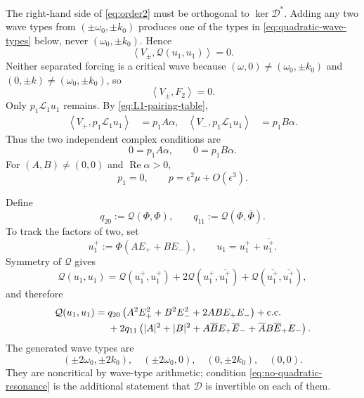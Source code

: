 \documentclass[11pt]{article}
\newcommand{\cQ}{\mathcal{Q}}
\newcommand{\cL}{\mathcal{L}}
\newcommand{\cD}{\mathcal{D}}
\newcommand{\ip}[2]{\left\langle #1,#2\right\rangle}
\newcommand{\cc}{\mathrm{c.c.}}
\DeclareMathOperator{\RePart}{Re}
\begin{document}
The right-hand side of \eqref{eq:order2} must be orthogonal to
$\ker\cD^*$.  Adding any two wave types from
$(\pm\omega_0,\pm k_0)$ produces one of the types in
\eqref{eq:quadratic-wave-types} below, never $(\omega_0,\pm k_0)$.  Hence
\begin{equation}
 \ip{V_\pm}{\cQ(u_1,u_1)}=0.
 \label{eq:Q-second-projection}
\end{equation}
Neither separated forcing is a critical wave because
$(\omega,0)\ne(\omega_0,\pm k_0)$ and
$(0,\pm k)\ne(\omega_0,\pm k_0)$, so
\begin{equation}
 \ip{V_\pm}{F_2}=0.
 \label{eq:F2-projection}
\end{equation}
Only $p_1\cL_1u_1$ remains.  By
\eqref{eq:L1-pairing-table},
\begin{align}
 \ip{V_+}{p_1\cL_1u_1}&=p_1A\alpha,
 &\ip{V_-}{p_1\cL_1u_1}&=p_1B\alpha.
 \label{eq:p1-projections}
\end{align}
Thus the two independent complex conditions are
\begin{equation}
 0=p_1A\alpha,
 \qquad 0=p_1B\alpha.
 \label{eq:p1-conditions}
\end{equation}
For $(A,B)\ne(0,0)$ and $\RePart\alpha>0$,
\begin{equation}
 \boxed{p_1=0,\qquad p=\epsilon^2\mu+O(\epsilon^3).}
 \label{eq:p1-zero}
\end{equation}

Define
\begin{equation}
 q_{20}:=\cQ(\Phi,\Phi),
 \qquad
 q_{11}:=\cQ(\Phi,\overline\Phi).
 \label{eq:q-vectors}
\end{equation}
To track the factors of two, set
\begin{equation}
 u_1^+:=\Phi(AE_++BE_-),
 \qquad u_1=u_1^++\overline{u_1^+}.
\end{equation}
Symmetry of $\cQ$ gives
\begin{equation}
 \cQ(u_1,u_1)=\cQ(u_1^+,u_1^+)
 +2\cQ(u_1^+,\overline{u_1^+})
 +\cQ(\overline{u_1^+},\overline{u_1^+}),
 \label{eq:Q-three-parts}
\end{equation}
and therefore
\begin{align}
 \cQ(u_1,u_1)={}&q_{20}
 \left(A^2E_+^2+B^2E_-^2+2AB E_+E_-\right)+\cc
 \notag\\
 &+2q_{11}\left(
 |A|^2+|B|^2+A\overline B E_+\overline E_-
 +\overline A B\overline E_+E_-
 \right).
 \label{eq:Q-u1-u1}
\end{align}
The generated wave types are
\begin{equation}
 (\pm2\omega_0,\pm2k_0),\quad
 (\pm2\omega_0,0),\quad
 (0,\pm2k_0),\quad(0,0).
 \label{eq:quadratic-wave-types}
\end{equation}
They are noncritical by wave-type arithmetic; condition
\eqref{eq:no-quadratic-resonance} is the additional statement that $\cD$ is
invertible on each of them.
\end{document}

